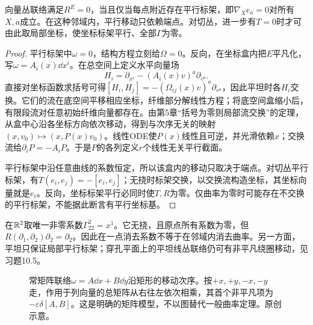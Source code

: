 \begin{theorem}[平坦性与局部平行标架]\label{thm:flat-parallel-frame}
向量丛联络满足$R^E=0$，当且仅当每点附近存在平行标架，即$\nabla_Xe_a=0$对所有$X,a$成立。在这种邻域内，平行移动只依赖端点。对切丛，进一步有$T=0$时才可由此取局部坐标，使坐标标架平行、全部$\Gamma$为零。
\end{theorem}
\begin{proof}
平行标架中$\omega=0$，结构方程立刻给$\Omega=0$。反向，在坐标盒内把$E$平凡化，写$\omega=A_i(x)\dd x^i$。在总空间上定义水平向量场
\[
 H_i=\partial_{x^i}-(A_i(x)v)^a\partial_{v^a}.
\]
直接对坐标函数求括号可得$[H_i,H_j]=-(\Omega_{ij}(x)v)^a\partial_{v^a}$，因此平坦时各$H_i$交换。它们的流在底空间平移相应坐标，纤维部分解线性方程；将底空间盒缩小后，有限段流对任意初始纤维向量都存在。由第5章“括号为零则局部流交换”的定理，从盒中心沿各坐标方向依次移动，得到与次序无关的映射$(x,v_0)\mapsto(x,P(x)v_0)$。线性ODE使$P(x)$线性且可逆，并光滑依赖$x$；交换流给$\partial_iP=-A_iP$。于是$P$的各列定义$r$个线性无关平行截面。

平行标架中沿任意曲线的系数恒定，所以该盒内的移动只取决于端点。对切丛平行标架，有$T(e_i,e_j)=-[e_i,e_j]$；无挠时标架交换，以交换流构造坐标，其坐标向量就是$e_i$。反向，坐标标架平行必同时使$T,R$为零。仅曲率为零时可能存在不交换的平行标架，不能据此断言有平行坐标基。
\end{proof}

\begin{example}[一点的系数与整个邻域的平坦性]
在$\mathbb{R}^2$取唯一非零系数$\Gamma^2_{22}=x^1$。它无挠，且原点所有系数为零，但$R(\partial_1,\partial_2)\partial_2=\partial_2$。因此在一点消去系数不等于在邻域内消去曲率。另一方面，平坦只保证局部平行标架；穿孔平面上的平坦线丛联络仍可有非平凡绕圈移动，见习题10.5。
\end{example}
\begin{figure}[htbp]
\centering
\caption{常矩阵联络$\omega=A\dd x+B\dd y$沿矩形的移动次序。按$+x,+y,-x,-y$走，作用于列向量的总矩阵从右往左依次相乘，其首个非平凡项为$-\varepsilon\delta[A,B]$。这是明确的矩阵模型，不以图替代一般曲率定理。原创示意。}
\label{fig:connection-loop}
\end{figure}
